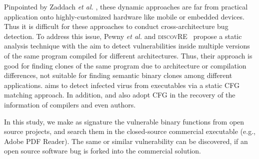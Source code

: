 Pinpointed by Zaddach \emph{et al.} \cite{DBLP:conf/ndss/ZaddachBFB14}, these dynamic approaches are far from practical application onto highly-customized hardware like mobile or embedded devices. Thus it is difficult for these approaches to conduct cross-architecture bug detection.
To address this issue, Pewny \emph{et al.} \cite{DBLP:conf/sp/PewnyGGRH15} and \textsc{\small discovRE}~\cite{sebastian2016discovre} propose a static analysis technique
with the aim to detect vulnerabilities inside multiple versions of the same program compiled for different architectures. Thus, their approach is good for finding clones of the same program due to architecture or compilation differences, not suitable for finding semantic binary clones among different applications.
 \cite{DBLP:conf/dimva/BruschiMM06} aims to detect infected virus from executables via a static CFG matching approach.
In addition, \cite{DBLP:conf/esorics/RosenblumZM11} and \cite{DBLP:conf/paste/RosenblumMZ10} also adopt CFG in the recovery of the information of compilers and even authors.

In this study, we make as signature the vulnerable binary functions from open source projects, and search them in the closed-source commercial executable (e.g., Adobe PDF Reader).
The same or similar vulnerability can be discovered, if an open source software bug is forked into the commercial solution.
